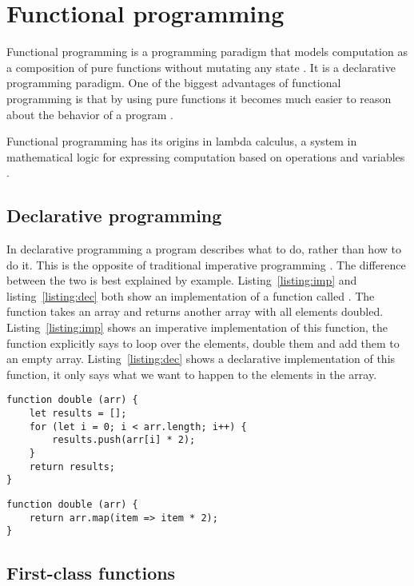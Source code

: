 \section{Functional programming} %
\label{sub:fp}

Functional programming is a programming paradigm that models computation as a composition of pure functions without mutating any state \cite{func-js}. It is a declarative programming paradigm. One of the biggest advantages of functional programming is that by using pure functions it becomes much easier to reason about the behavior of a program \cite{func-js}.

Functional programming has its origins in lambda calculus, a system in mathematical logic for expressing computation based on operations and variables \cite{lambda}.

\subsection{Declarative programming}

In declarative programming a program describes what to do, rather than how to do it. This is the opposite of traditional imperative programming \cite{intro-func}. The difference between the two is best explained by example. Listing~\ref{listing:imp} and listing~\ref{listing:dec} both show an implementation of a function called . The function takes an array and returns another array with all elements doubled. Listing~\ref{listing:imp} shows an imperative implementation of this function, the function explicitly says to loop over the elements, double them and add them to an empty array. Listing~\ref{listing:dec} shows a declarative implementation of this function, it only says what we want to happen to the elements in the array.

\begin{lstlisting}[caption=Imperative implementation of the double function,label=listing:imp]
function double (arr) {
	let results = [];
	for (let i = 0; i < arr.length; i++) {
		results.push(arr[i] * 2);
	}
	return results;
}
\end{lstlisting}

\begin{lstlisting}[caption=Declarative implementation of the double function,label=listing:dec]
function double (arr) {
	return arr.map(item => item * 2);
}
\end{lstlisting}


\subsection{First-class functions}

